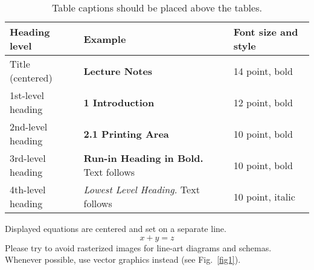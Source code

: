 \documentclass[runningheads]{llncs}
\begin{document}
	\begin{table}
		\caption{Table captions should be placed above the
			tables.}\label{tab1}
		\begin{tabular}{|l|l|l|}
			\hline
			Heading level &  Example & Font size and style\\
			\hline
			Title (centered) &  {\Large\bfseries Lecture Notes} & 14 point, bold\\
			1st-level heading &  {\large\bfseries 1 Introduction} & 12 point, bold\\
			2nd-level heading & {\bfseries 2.1 Printing Area} & 10 point, bold\\
			3rd-level heading & {\bfseries Run-in Heading in Bold.} Text follows & 10 point, bold\\
			4th-level heading & {\itshape Lowest Level Heading.} Text follows & 10 point, italic\\
			\hline
		\end{tabular}
	\end{table}
	
	
	\noindent Displayed equations are centered and set on a separate
	line.
	\begin{equation}
		x + y = z
	\end{equation}
	Please try to avoid rasterized images for line-art diagrams and
	schemas. Whenever possible, use vector graphics instead (see
	Fig.~\ref{fig1}).
	
	
\end{document}
